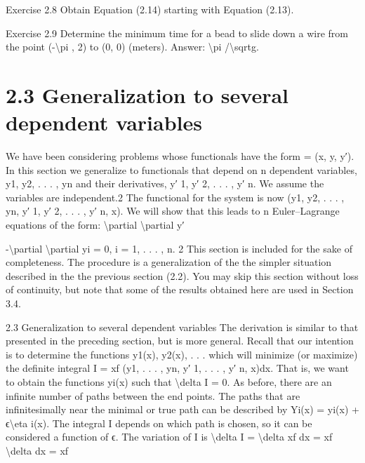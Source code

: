 \begin{exercise}
Exercise 2.8 Obtain Equation (2.14) starting with Equation (2.13).
\end{exercise}

\begin{exercise}
Exercise 2.9 Determine the minimum time for a bead to slide down a wire
from the point (-\textbackslash{}pi , 2) to (0, 0) (meters). Answer: \textbackslash{}pi /\textbackslash{}sqrtg.
\end{exercise}

\section*{2.3  Generalization to several dependent variables}

We have been considering problems whose functionals have the form  =
(x, y, y′). In this section we generalize to functionals that depend on n
dependent variables, y1, y2, . . . , yn and their derivatives, y′
1, y′
2, . . . , y′
n. We
assume the variables are independent.2
The functional for the system is now (y1, y2, . . . , yn, y′
1, y′
2, . . . , y′
n, x).
We will show that this leads to n Euler--Lagrange equations of the form:
\textbackslash{}partial
\textbackslash{}partial y′

-\textbackslash{}partial
\textbackslash{}partial yi
= 0,
i = 1, . . . , n.
2 This section is included for the sake of completeness. The procedure is a generalization of the
the simpler situation described in the the previous section (2.2). You may skip this section
without loss of continuity, but note that some of the results obtained here are used in
Section 3.4.

2.3
Generalization to several dependent variables
The derivation is similar to that presented in the preceding section, but is more
general.
Recall that our intention is to determine the functions y1(x), y2(x), . . . which
will minimize (or maximize) the definite integral
I =
xf
(y1, . . . , yn, y′
1, . . . , y′
n, x)dx.
That is, we want to obtain the functions yi(x) such that
\textbackslash{}delta I = 0.
As before, there are an infinite number of paths between the end points.
The paths that are infinitesimally near the minimal or true path can be
described by
Yi(x) = yi(x) + ϵ\textbackslash{}eta i(x).
The integral I depends on which path is chosen, so it can be considered a
function of ϵ.
The variation of I is
\textbackslash{}delta I = \textbackslash{}delta
xf
dx =
xf
\textbackslash{}delta dx =
xf

